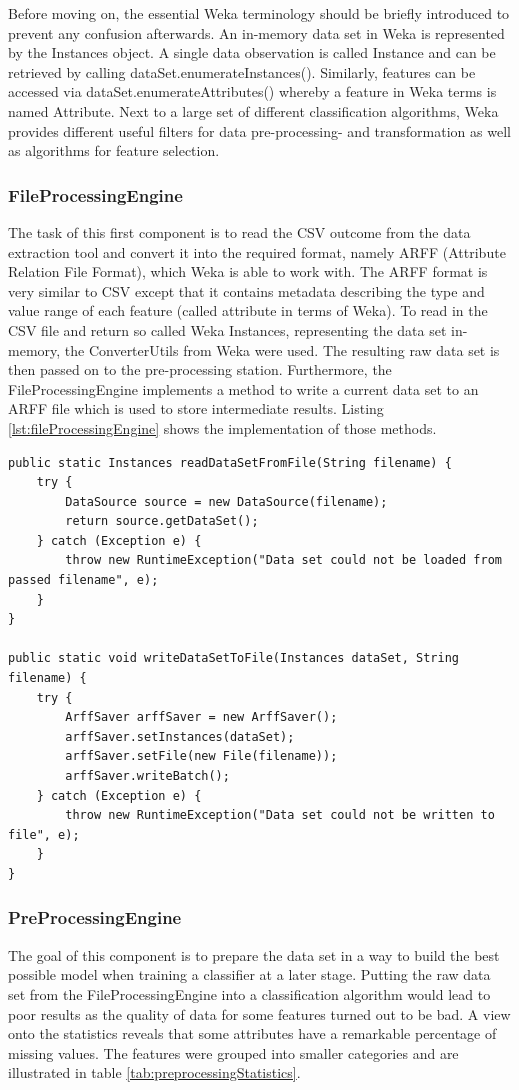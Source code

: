 Before moving on, the essential Weka terminology should be briefly introduced to prevent any confusion afterwards. An in-memory data set in Weka is represented by the Instances object. A single data observation is called Instance and can be retrieved by calling dataSet.enumerateInstances(). Similarly, features can be accessed via dataSet.enumerateAttributes() whereby a feature in Weka terms is named Attribute. Next to a large set of different classification algorithms, Weka provides different useful filters for data pre-processing- and transformation as well as algorithms for feature selection. 

\subsubsection{FileProcessingEngine}
The task of this first component is to read the CSV outcome from the data extraction tool and convert it into the required format, namely ARFF (Attribute Relation File Format), which Weka is able to work with. The ARFF format is very similar to CSV except that it contains metadata describing the type and value range of each feature (called attribute in terms of Weka). To read in the CSV file and return so called Weka Instances, representing the data set in-memory, the ConverterUtils from Weka were used. The resulting raw data set is then passed on to the pre-processing station. Furthermore, the FileProcessingEngine implements a method to write a current data set to an ARFF file which is used to store intermediate results. Listing \ref{lst:fileProcessingEngine} shows the implementation of those methods. 

\begin{lstlisting}[caption={Implementation of FileProessingEngine}, label={lst:fileProcessingEngine}]
public static Instances readDataSetFromFile(String filename) {
	try {
		DataSource source = new DataSource(filename);
		return source.getDataSet();
	} catch (Exception e) {
		throw new RuntimeException("Data set could not be loaded from passed filename", e);
	}
}

public static void writeDataSetToFile(Instances dataSet, String filename) {
	try {
		ArffSaver arffSaver = new ArffSaver();
		arffSaver.setInstances(dataSet);
		arffSaver.setFile(new File(filename));
		arffSaver.writeBatch();
	} catch (Exception e) {
		throw new RuntimeException("Data set could not be written to file", e);
	}
}
\end{lstlisting}

\subsubsection{PreProcessingEngine}
The goal of this component is to prepare the data set in a way to build the best possible model when training a classifier at a later stage. Putting the raw data set from the FileProcessingEngine into a classification algorithm would lead to poor results as the quality of data for some features turned out to be bad. A view onto the statistics reveals that some attributes have a remarkable percentage of missing values. The features were grouped into smaller categories and are illustrated in table \ref{tab:preprocessingStatistics}.

